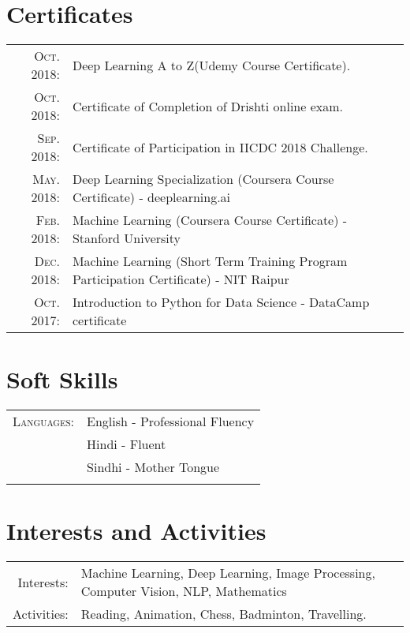 \documentclass[11pt,a4paper,calibri]{moderncv}        %
\begin{document}
\begin{itemize}[leftmargin=0.0in]
\section{Certificates} 
\begin{tabular}{rl} 
\textsc{Oct.} 2018: \vspace{-1pt} & Deep Learning A to Z(Udemy Course Certificate).\\
\textsc{Oct.} 2018: \vspace{-1pt} & Certificate of Completion of Drishti online exam.\\
\textsc{Sep.} 2018: \vspace{-1pt} & Certificate of Participation in IICDC 2018 Challenge.\\
\textsc{May.} 2018: \vspace{-1pt} & Deep Learning Specialization (Coursera Course Certificate) - deeplearning.ai\\
\textsc{Feb.} 2018: \vspace{-1pt} & Machine Learning (Coursera Course Certificate) - Stanford University\\
\textsc{Dec.} 2018: \vspace{-1pt}& Machine Learning (Short Term Training Program Participation Certificate) - NIT Raipur\\
\textsc{Oct.} 2017: \vspace{-1pt}& Introduction to Python for Data Science - DataCamp certificate\\
\end{tabular} 

\section{Soft Skills}
\begin{tabular}{r|p{11cm}}
\textsc{Languages}: \vspace & English - Professional Fluency\\ \vspace & Hindi - Fluent \\ \vspace& Sindhi - Mother Tongue\\\multicolumn{2}{c}{} \\
\end{tabular}

\section{Interests and Activities}
\begin{tabular}{rl} 
Interests: \vspace &  Machine Learning, Deep Learning, Image Processing, Computer Vision, NLP, Mathematics\\
Activities: \vspace & Reading, Animation, Chess, Badminton, Travelling.
\end{tabular}


\end{itemize}
\end{document}
